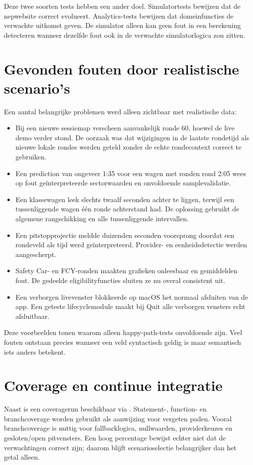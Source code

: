 Deze twee soorten tests hebben een ander doel. Simulatortests bewijzen dat de nepwebsite correct
evolueert. Analytics-tests bewijzen dat domeinfuncties de verwachte uitkomst geven. De simulator
alleen kan geen fout in een berekening detecteren wanneer dezelfde fout ook in de verwachte
simulatorlogica zou zitten.

\section{Gevonden fouten door realistische scenario's}
Een aantal belangrijke problemen werd alleen zichtbaar met realistische data:

\begin{itemize}
  \item Bij een nieuwe sessiemap verscheen aanvankelijk ronde 60, hoewel de live demo verder stond.
        De oorzaak was dat wijzigingen in de laatste rondetijd als nieuwe lokale rondes werden
        geteld zonder de echte rondecontext correct te gebruiken.
  \item Een prediction van ongeveer 1:35 voor een wagen met ronden rond 2:05 wees op fout
        geïnterpreteerde sectorwaarden en onvoldoende samplevalidatie.
  \item Een klassewagen leek slechts twaalf seconden achter te liggen, terwijl een tussenliggende
        wagen één ronde achterstand had. De oplossing gebruikt de algemene rangschikking en alle
        tussenliggende intervallen.
  \item Een pitstopprojectie meldde duizenden seconden voorsprong doordat een rondeveld als tijd
        werd geïnterpreteerd. Provider- en eenheidsdetectie werden aangescherpt.
  \item Safety Car- en FCY-ronden maakten grafieken onleesbaar en gemiddelden fout. De gedeelde
        eligibilityfuncties sluiten ze nu overal consistent uit.
  \item Een verborgen livevenster blokkeerde op macOS het normaal afsluiten van de app. Een geteste
        lifecyclemodule maakt bij Quit alle verborgen vensters echt afsluitbaar.
\end{itemize}

Deze voorbeelden tonen waarom alleen happy-path-tests onvoldoende zijn. Veel fouten ontstaan precies
wanneer een veld syntactisch geldig is maar semantisch iets anders betekent.

\section{Coverage en continue integratie}
Naast  is een coveragerun beschikbaar via . Statement-,
function- en branchcoverage worden gebruikt als aanwijzing voor vergeten paden. Vooral
branchcoverage is nuttig voor fallbacklogica, nullwaarden, providerkeuzes en gesloten/open
pitvensters. Een hoog percentage bewijst echter niet dat de verwachtingen correct zijn; daarom
blijft scenarioselectie belangrijker dan het getal alleen.

